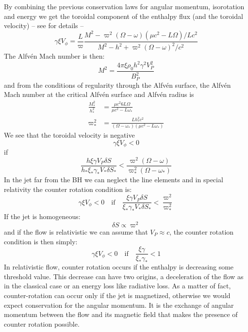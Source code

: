 \documentclass[10pt,a4paper,english]{article}
\begin{document}
By combining the previous conservation laws for angular momentum, isorotation
and energy we get the toroidal component of the enthalpy flux (and the toroidal
velocity) -- see \cite{2014ApJ...788L..19C} for details --
\begin{equation}
    \gamma\xi V_\phi = \frac{L}{\varpi} \frac{M^2 - \varpi^2 (\Omega - \omega) (\mu c^2 - L \Omega) / Lc^2 }{M^2 - h^2 + \varpi^2 (\Omega - \omega)^2 / c^2}
\end{equation}
The Alfvén Mach number is then:
\begin{equation}
    M^2 = \frac{4\pi\xi\rho_0 h^2\gamma^2 V_P^2}{B_P^2}
\end{equation}
and from the conditions of regularity through the Alfvén surface, the Alfvén
Mach number at the critical Alfvén surface and Alfvén radius is
\begin{align}
    \frac{M_*^2}{h_*^2} & = \frac{\mu c^2 6 L\Omega}{\mu c^2 - L\omega_*}\\
    \varpi_*^2 & = \frac{Lh_*^2 c^2}{(\Omega - \omega_*)(\mu c^2 - L\omega_*)}
\end{align}
We see that the toroidal velocity is negative
\begin{equation}
    \gamma\xi V_\phi < 0
\end{equation}
if
\begin{equation}
    \frac{h \xi\gamma V_P \delta S}{h_* \xi_* \gamma_* V_* \delta S_*} < \frac{\varpi^2 (\Omega - \omega)}{\varpi_*^2(\Omega - \omega_*)}
\end{equation}
In the jet far from the BH we can neglect the line elements and in special
relativity the counter rotation condition is:
\begin{equation}
    \gamma\xi V_\phi < 0 \quad \textrm{if} \quad \frac{\xi\gamma V_P\delta S}{\xi_*\gamma_* V_* \delta S_*} < \frac{\varpi^2}{\varpi_*^2}
\end{equation}
If the jet is homogeneous:
\begin{equation}
    \delta S \propto \varpi^2
\end{equation}
and if the flow is relativistic we can assume that $V_P \approx c$, the counter
rotation condition is then simply:
\begin{equation}
    \gamma\xi V_\phi < 0 \quad \textrm{if} \quad \frac{\xi\gamma}{\xi_*\gamma_*} < 1
\end{equation}
In relativistic flow, counter rotation occurs if the enthalpy is decreasing
some threshold value. This decrease can have two origins, a deceleration of the
flow as in the classical case or an energy loss like radiative loss. As a
matter of fact, counter-rotation can occur only if the jet is magnetized,
otherwise we would expect conservation for the angular momentum. It is the
exchange of angular momentum between the flow and its magnetic field that makes
the presence of counter rotation possible.
\end{document}
